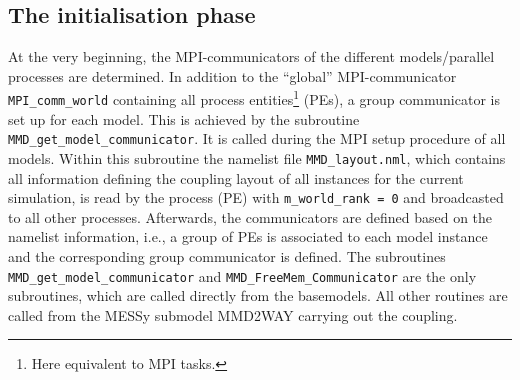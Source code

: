 \documentclass[twoside]{article}
\begin{document}
\subsection{The initialisation phase} \label{ssec:initialp}
At the very beginning, the MPI-communicators of the different models/parallel
processes are determined. In addition to the ``global'' MPI-communicator 
\verb|MPI_comm_world| containing all process entities\footnote{Here equivalent
to MPI tasks.} (PEs), a group communicator is set up for each model. 
This is achieved by the subroutine \verb|MMD_get_model_communicator|. 
It is called during the MPI setup procedure of all models. 
Within this subroutine the namelist file \verb|MMD_layout.nml|, which 
contains all information defining the coupling layout of 
all instances for the current simulation, is read by the process (PE) with
\verb|m_world_rank = 0| and broadcasted to all other processes.
 Afterwards, the communicators are defined based on the namelist information,
i.e., a group of PEs is associated to each model instance and the corresponding
group communicator is defined.
The subroutines \verb|MMD_get_model_communicator| and  
\verb|MMD_FreeMem_Communicator| are the only subroutines, which are called
 directly from the basemodels. All other routines are called from
 the MESSy submodel MMD2WAY carrying out the coupling.
\end{document}
